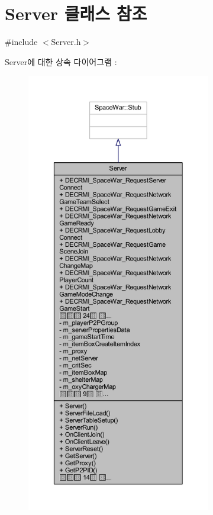 \hypertarget{class_server}{}\section{Server 클래스 참조}
\label{class_server}


{\ttfamily \#include $<$Server.\+h$>$}



Server에 대한 상속 다이어그램 \+: 
\nopagebreak
\begin{figure}[H]
\begin{center}
\leavevmode
\includegraphics[height=550pt]{class_server__inherit__graph}
\end{center}
\end{figure}


